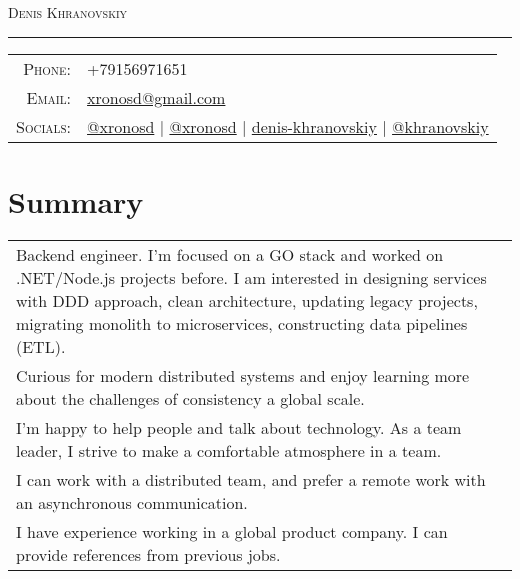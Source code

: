 \documentclass[a4paper,11pt]{article}
\newcommand{\sotag}[1]{\tikz[baseline]{\node[anchor=base, rounded corners=0.5ex, text height=1.5ex, text depth=.25ex, fill=tagbg, draw=tagbg, text=tagtxt] {#1};}}
\begin{document}
\par{\centering
		{\Huge \textsc{Denis Khranovskiy}
	}\bigskip\par}

\hrule
\vspace{0.5em}
\begin{tabular}{rl}
  \textsc{Phone:}     & +79156971651\\
  \textsc{Email:}     & \href{mailto:xronosd@gmail.com}{xronosd@gmail.com}\\
  \textsc{Socials:}   %
                    & \faPaperPlane{} \href{https://t.me/Xronosd}{@xronosd}
                    | \faTwitter{} \href{https://twitter.com/xronosd}{@xronosd} 
                    | \faLinkedin{} \href{https://www.linkedin.com/in/denis-khranovskiy/}{denis-khranovskiy}
                    | \faGithub{} \href{https://github.com/khranovskiy/}{@khranovskiy}
\end{tabular}

\section{Summary}
\begin{tabular}{p{}}
  Backend engineer. I'm focused on a GO stack and worked on .NET/Node.js projects before. I am interested in designing services with DDD approach, clean architecture, updating legacy projects, migrating monolith to microservices, constructing data pipelines (ETL). \\ 
  Curious for modern distributed systems and enjoy learning more about the challenges of consistency a global scale. \\  
  I'm happy to help people and talk about technology. As a team leader, I strive to make a comfortable atmosphere in a team. \\
  I can work with a distributed team, and prefer a remote work with an asynchronous communication. \\ 
  I have experience working in a global product company. I can provide references from previous jobs.
\end{tabular}
\end{document}

